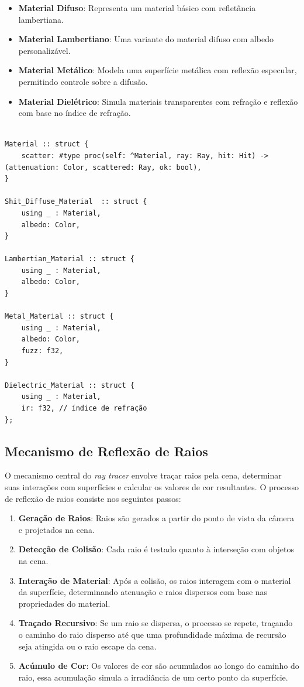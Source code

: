 \documentclass[english, 
               brazil, 
               bsc] %
               {dcomp-abntex2}
\begin{document}
\begin{itemize}
\item \textbf{Material Difuso}: Representa um material básico com refletância lambertiana.
\item \textbf{Material Lambertiano}: Uma variante do material difuso com albedo personalizável.
\item \textbf{Material Metálico}: Modela uma superfície metálica com reflexão especular, permitindo controle sobre a difusão.
\item \textbf{Material Dielétrico}: Simula materiais transparentes com refração e reflexão com base no índice de refração.
\end{itemize}

\begin{verbatim}

Material :: struct {
    scatter: #type proc(self: ^Material, ray: Ray, hit: Hit) -> (attenuation: Color, scattered: Ray, ok: bool),
}

Shit_Diffuse_Material  :: struct {
    using _ : Material,
    albedo: Color,
}

Lambertian_Material :: struct {
    using _ : Material,
    albedo: Color,
}

Metal_Material :: struct {
    using _ : Material,
    albedo: Color,
    fuzz: f32,
}

Dielectric_Material :: struct {
    using _ : Material,
    ir: f32, // índice de refração
};
\end{verbatim}

\subsection{Mecanismo de Reflexão de Raios}

O mecanismo central do \textit{ray tracer} envolve traçar raios pela cena, determinar suas interações com superfícies e calcular os valores de cor resultantes. O processo de reflexão de raios consiste nos seguintes passos:

\begin{enumerate}
\item \textbf{Geração de Raios}: Raios são gerados a partir do ponto de vista da câmera e projetados na cena.
\item \textbf{Detecção de Colisão}: Cada raio é testado quanto à interseção com objetos na cena.
\item \textbf{Interação de Material}: Após a colisão, os raios interagem com o material da superfície, determinando atenuação e raios dispersos com base nas propriedades do material.
\item \textbf{Traçado Recursivo}: Se um raio se dispersa, o processo se repete, traçando o caminho do raio disperso até que uma profundidade máxima de recursão seja atingida ou o raio escape da cena.
\item \textbf{Acúmulo de Cor}: Os valores de cor são acumulados ao longo do caminho do raio, essa acumulação simula a irradiância de um certo ponto da superfície.

\end{enumerate}
\end{document}
